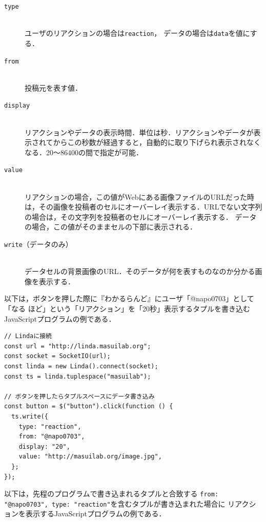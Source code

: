 \vspace{2mm}
\begin{description}
\item[\texttt{type}]\mbox{}\\
ユーザのリアクションの場合は\texttt{reaction}，
データの場合は\texttt{data}を値にする．

\item[\texttt{from}]\mbox{}\\
投稿元を表す値．

\item[\texttt{display}]\mbox{}\\
リアクションやデータの表示時間．単位は秒．リアクションやデータが表示されてからこの秒数が経過すると，自動的に取り下げられ表示されなくなる．20〜86400の間で指定が可能．

\item[\texttt{value}]\mbox{}\\
リアクションの場合，この値がWebにある画像ファイルのURLだった時は，その画像を投稿者のセルにオーバーレイ表示する．URLでない文字列の場合は，その文字列を投稿者のセルにオーバーレイ表示する．
データの場合，この値がそのままセルの下部に表示される．

\item[\texttt{write}（データのみ）]\mbox{}\\
データセルの背景画像のURL．そのデータが何を表すものなのか分かる画像を表示する．
\end{description}

以下は，ボタンを押した際に『わかるらんど』にユーザ「@napo0703」として「なる ほど」という「リアクション」を「20秒」表示するタプルを書き込むJavaScriptプログラムの例である．

\vspace{2mm}
\begin{lstlisting}
// Lindaに接続
const url = "http://linda.masuilab.org";
const socket = SocketIO(url);
const linda = new Linda().connect(socket);
const ts = linda.tuplespace("masuilab");

// ボタンを押したらタプルスペースにデータ書き込み
const button = $("button").click(function () {
  ts.write({
    type: "reaction",
    from: "@napo0703",
    display: "20",
    value: "http://masuilab.org/image.jpg",
  };
});
\end{lstlisting}

以下は，先程のプログラムで書き込まれるタプルと合致する
\texttt{{from: "@napo0703", type: "reaction"}}を含むタプルが書き込まれた場合に
リアクションを表示するJavaScriptプログラムの例である．

